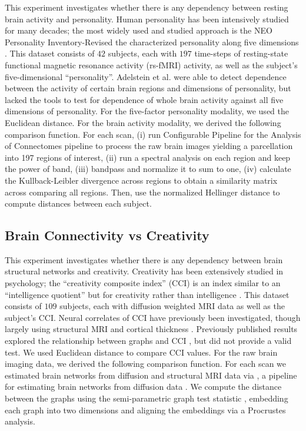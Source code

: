\documentclass[11pt]{extarticle}
\begin{document}
This experiment investigates whether there is any dependency between resting brain activity and personality. Human personality has been intensively studied for many decades; the most widely used and studied approach is the NEO Personality Inventory-Revised the characterized personality along five dimensions \cite{Costa1992}.
%
This dataset consists of $42$ subjects, each with  $197$ time-steps of resting-state functional magnetic resonance activity (rs-fMRI) activity, as well as the subject's five-dimensional ``personality''. Adelstein et al. \cite{AdelsteinEtAl2011} were able to detect dependence between the activity of certain brain regions and dimensions of personality, but lacked the tools to test for dependence of whole brain activity against all five dimensions of personality.
%
For the five-factor personality modality, we  used the Euclidean distance. For the brain activity modality,
we derived the following comparison function. For each scan, (i) run Configurable Pipeline for the
 Analysis of Connectomes pipeline \cite{CPAC2015} to process the raw brain images yielding a parcellation into
197 regions of interest,
(ii) run a spectral analysis on each region and keep the power of band,
(iii) bandpass and normalize it to sum to one,
(iv) calculate the Kullback-Leibler divergence across regions to obtain a similarity matrix across comparing all regions.
Then, use the normalized Hellinger distance to compute distances between each subject.


\subsection{Brain Connectivity vs Creativity}
\label{app:creativity}

This experiment investigates whether there is any dependency between brain structural networks and creativity. Creativity has  been extensively studied in  psychology; the ``creativity composite index'' (CCI) is an index similar to an ``intelligence quotient'' but for creativity rather than intelligence \cite{Jung2009}.
%
This dataset consists of $109$ subjects, each with diffusion weighted MRI data as well as the subject's CCI.
Neural correlates of CCI have previously been investigated, though largely using structural MRI and cortical thickness \cite{Jung2009}.  Previously published results explored the relationship between graphs and  CCI \cite{Koutra15a}, but did not provide a valid test.
%
We used Euclidean distance to compare CCI values.
For the raw brain imaging data, we derived the following comparison function.  For each scan we estimated brain networks from diffusion and structural MRI data via  \Migraine, a pipeline for estimating brain networks from diffusion data \cite{GrayRoncal2013}.
We compute the distance between the graphs using the semi-parametric graph test statistic \cite{Sussman2013,ShenVogelsteinPriebe2016,Tang2016}, embedding each graph into two dimensions and aligning the embeddings via a Procrustes analysis.
\end{document}
